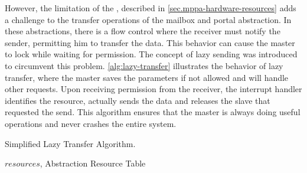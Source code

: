 			However, the limitation of the \dma, described in
			\autoref{sec.mppa-hardware-resources} adds a challenge to the
			transfer operations of the mailbox and portal abstraction.
			In these abstractions, there is a flow control where the receiver
			must notify the sender, permitting him to transfer the data. This
			behavior can cause the master to lock while waiting for permission.
			The concept of lazy sending was introduced to circumvent this
			problem. \autoref{alg:lazy-transfer} illustrates the behavior of
			lazy transfer, where the master saves the parameters if not
			allowed and will handle other requests. Upon receiving permission
			from the receiver, the interrupt handler identifies the resource,
			actually sends the data and releases the slave that requested the
			send. This algorithm ensures that the master is always doing useful
			operations and never crashes the entire system.

			\begin{algorithm}[!tb]
				\caption{Simplified Lazy Transfer Algorithm.}%
				\label{alg:lazy-transfer}%
				\begin{algorithmic}[1]
				\Require $resources$, Abstraction Resource Table


						\Else
						\EndIf
					\EndProcedure%


						\Else
						\EndIf
					\EndProcedure%


						                                
					\EndProcedure%

				\end{algorithmic}%

			\end{algorithm}

